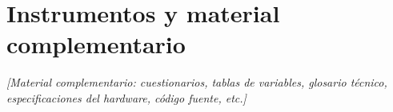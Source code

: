 
\chapter{Instrumentos y material complementario}
\label{anexo:a}

\textit{[Material complementario: cuestionarios, tablas de variables, glosario técnico,
especificaciones del hardware, código fuente, etc.]}
